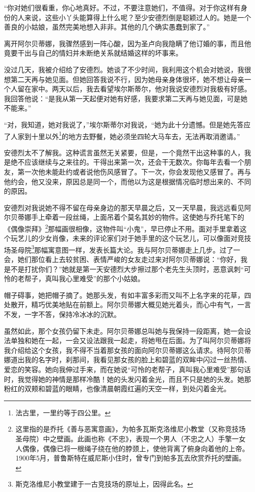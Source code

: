 \par “你对她们很看重，你心地真好。不过，不要注意她们，不值得。对于你这样有身份的人来说，这些小丫头能算得上什么呢？至少安德烈倒是聪颖过人的。她是一个善良的小姑娘，虽然完美地想入非非。其他的几个确实愚蠢到家了。”
\par 离开阿尔贝蒂娜，我骤然感到一阵心酸，因为圣卢向我隐瞒了他订婚的事，而且他竟要干出与自己的情妇并未断绝关系就结婚这样的坏事来。
\par 没过几天，我被介绍给了安德烈。她谈了不少时间，我利用这个机会对她说，我很想第二天再与她见面。但她回答我说不行，因为她母亲身体很坏，她不想让母亲一个人留在家中。两天以后，我去看望埃尔斯蒂尔，他对我说安德烈对我极有好感。我回答他说：“是我从第一天起便对她有好感，我要求第二天再与她见面，可是她不能来。”
\par “对，我知道，她对我说了，”埃尔斯蒂尔对我说，“她为此十分遗憾。但是她先答应了人家到十里以外\footnote{法古里，一里约等于四公里。}的地方去野餐，她必须坐四轮大马车去，无法再取消邀请。”
\par 安德烈太不了解我。这种谎言虽然无关紧要，但是，一个竟然干出这种事的人，我是绝不应该继续与之来往的。干得出来第一次，还会干无数次。你每年去看一个朋友，第一次他未能赴约或者说他伤风感冒了。下一次，你会发现他又感冒了。再与他约会，他又没来，原因总是同一个，而他以为这是根据情况临时想出来的、不同的原因。
\par 安德烈对我说她不得不留在母亲身边的那天早晨之后，又一天早晨，我远远看见阿尔贝蒂娜手上牵着一段丝绳，上面吊着个莫名其妙的物件。这使她与乔托笔下的《偶像崇拜》\footnote{这里指的是乔托《善与恶寓意画》，为帕多瓦斯克洛维尼小教堂（又称竞技场圣母院）中之壁画。此画也称《不忠》，表现一个男人（不忠之人）手擎一女人偶像，偶像已将一根绳子绕在他的脖颈上，使他背离了俯身向着他的上帝。1900年5月，普鲁斯特在威尼斯小住时，曾专门到帕多瓦去欣赏乔托的壁画。}那幅画很相像，这物件叫“小鬼”，早已停止不用。面对手里拿着这个玩艺儿的少女肖像，未来的评论家们对于她手里的这个玩艺儿，可以像面对竞技场圣母院\footnote{斯克洛维尼小教堂建于一古竞技场的原址上，因得此名。}那幅寓意图一样，发表长篇大论。我与阿尔贝蒂娜走上几步。过了一会，她们那位看上去较贫困、表情严峻的女友走过来对阿尔贝蒂娜说：“你好，我是不是打扰你们？”她就是第一天安德烈大步擦过那个老先生头顶时，恶意讽刺“可怜的老帮子，真叫我心里难受”的那个小姑娘。
\par 帽子碍事，她把帽子摘了。她那头发，有如丰富多彩而又叫不上名字来的花草，四处散开，精巧优美地贴在前额上。阿尔贝蒂娜大概见她光着头，而心中有气，一言不发，一字不答，保持冷冰冰的沉默。
\par 虽然如此，那个女孩仍留下未走。阿尔贝蒂娜总叫她与我保持一段距离，她一会设法单独和她在一起，一会又设法跟我一起走，将她甩在后面。为了叫阿尔贝蒂娜将我介绍给这个女孩，我不得不当着那女孩的面向阿尔贝蒂娜这么请求。待阿尔贝蒂娜道出我的名字时，刹那间，我看见那女孩的脸上和碧蓝的双眸中闪过一丝热情、爱恋的笑容。她向我伸过手来，而在她说“可怜的老帮子，真叫我心里难受”那句话时，我觉得她的神情是那样冷酷！她的头发闪着金光，而且不只是她的头发。她那粉红的双颊和碧蓝的眼睛，也像清晨朝霞红遍的天空一样，到处闪着金光。
